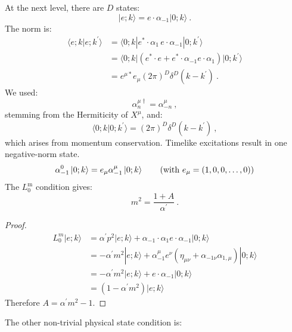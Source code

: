 At the next level, there are $D$ states:
\begin{equation}
	|e ; k\rangle=e \cdot \alpha_{-1}|0 ; k\rangle \:. \label{4.1.12}
\end{equation}
The norm is:
\begin{align}
	\langle e ; k \vert e ; k^{\prime}\rangle &= \langle 0 ; k |e^{*} \cdot \alpha_{1}\, e \cdot \alpha_{-1}| 0 ; k^{\prime}\rangle \nonumber \\
	&=\langle 0 ; k\vert (e^{*} \cdot e+e^{*} \cdot \alpha_{-1} e \cdot \alpha_{1})| 0 ; k^{\prime}\rangle  \nonumber \\
	&=e^{\mu *} e_{\mu}(2 \pi)^{D} \delta^{D}(k-k^{\prime}) \:.  \label{4.1.13}
\end{align}
We used:
\begin{equation}
	\alpha_{n}^{\mu \dagger}=\alpha_{-n}^{\mu} \:, \label{4.1.14}
\end{equation}
stemming from the Hermiticity of $X^\mu$, and:
\begin{equation}
	\langle 0 ; k \vert 0 ; k^{\prime}\rangle=(2 \pi)^{D} \delta^{D}(k-k^{\prime}) \:, \label{4.1.15}
\end{equation}
which arises from momentum conservation. Timelike excitations result in one negative-norm state.
\begin{align}
	\alpha_{-1}^{0}\ket{0;k}=e_{\mu}\alpha^{\mu}_{-1}\ket{0;k} \tag{with $e_{\mu}=(1,0,0,\ldots,0)$}
\end{align}
The $L_{0}^{\mathrm{m}}$ condition gives:
\begin{equation}
	m^{2}=\frac{1+A}{\alpha^{\prime}} \:. \label{4.1.16}
\end{equation}
\begin{tcolorbox}
	\begin{proof}
		\begin{align*}
			L_{0}^{m}|e; k\rangle&=\alpha^{\prime} p^{2}|e ; k\rangle+\alpha_{-1} \cdot \alpha_{1} e \cdot \alpha_{-1}|0 ; k\rangle \\
			&=-\alpha^{\prime} m^{2} |e; k\rangle+\alpha_{-1}^{\mu} e^{\nu}(\eta_{\mu \nu}+\alpha_{-1\nu}\alpha_{1, \mu})|0 ; k\rangle \\
			&=-\alpha^{\prime} m^{2} |e; k\rangle+e \cdot \alpha_{-1} |0; k\rangle \\
			&=(1-\alpha^{\prime} m^{2})|e; k\rangle
		\end{align*}
		Therefore $A=\alpha^{\prime} m^{2}-1$.
	\end{proof}
\end{tcolorbox}
\noindent
The other non-trivial physical state condition is:
